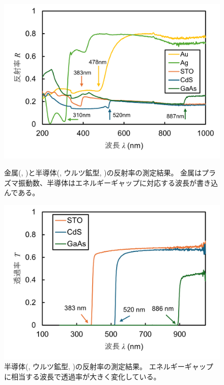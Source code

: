\documentclass[11pt,dvipdfmx,a4paper]{jsarticle}
\begin{document}
\begin{figure}[H]
    \begin{minipage}[t]{0.48\columnwidth}
        \centering
        \includegraphics[width = \columnwidth]{graph/graph1.png}
        \caption{金属(, )と半導体(, ウルツ鉱型, )の反射率の測定結果。
        金属はプラズマ振動数、半導体はエネルギーギャップに対応する波長が書き込んである。}
        \label{graph:01}
    \end{minipage}
    \hfil
    \begin{minipage}[t]{0.48\columnwidth}
        \centering
        \includegraphics[width = \columnwidth]{graph/graph2.png}
        \caption{半導体(, ウルツ鉱型, )の反射率の測定結果。
        エネルギーギャップに相当する波長で透過率が大きく変化している。}
        \label{graph:02}
    \end{minipage}
\end{figure}
\end{document}
